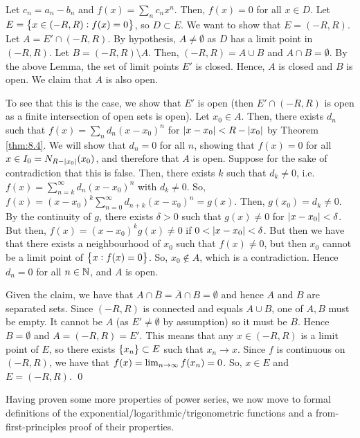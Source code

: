 \begin{nproof}
    Let $c_n = a_n - b_n$ and $f(x) = \sum_n c_nx^n$. Then, $f(x) = 0$ for all $x \in D$. Let $E = \set{x \in (-R, R): f(x) = 0}$, so $D \subset E$. We want to show that $E = (-R, R)$. Let $A = E' \cap (-R, R)$. By hypothesis, $A \neq \emptyset$ as $D$ has a limit point in $(-R, R)$. Let $B = (-R, R) \setminus A$. Then, $(-R, R) = A \cup B$ and $A \cap B = \emptyset$. By the above Lemma, the set of limit points $E'$ is closed. Hence, $A$ is closed and $B$ is open. We claim that $A$ is also open.

    To see that this is the case, we show that $E'$ is open (then $E' \cap (-R, R)$ is open as a finite intersection of open sets is open). Let $x_0 \in A$. Then, there exists $d_n$ such that $f(x) = \sum_n d_n(x - x_0)^n$ for $\abs{x - x_0} < R - \abs{x_0}$ by Theorem \ref{thm:8.4}. We will show that $d_n = 0$ for all $n$, showing that $f(x) = 0$ for all $x \in I_0 = N_{R - \abs{x_0}}(x_0)$, and therefore that $A$ is open. Suppose for the sake of contradiction that this is false. Then, there exists $k$ such that $d_k \neq 0$, i.e. $f(x) = \sum_{n=k}^\infty d_n(x - x_0)^n$ with $d_k \neq 0$. So, $f(x) = (x-x_0)^k\sum_{n=0}^\infty d_{n+k}(x - x_0)^n = g(x)$. Then, $g(x_0) = d_k \neq 0$. By the continuity of $g$, there exists $\delta > 0$ such that $g(x) \neq 0$ for $\abs{x - x_0} < \delta$. But then, $f(x) = (x - x_0)^kg(x) \neq 0$ if $0 < \abs{x - x_0} < \delta$. But then we have that there exists a neighbourhood of $x_0$ such that $f(x) \neq 0$, but then $x_0$ cannot be a limit point of $\set{x: f(x) = 0}$. So, $x_0 \notin A$, which is a contradiction. Hence $d_n = 0$ for all $n \in \mathbb{N}$, and $A$ is open. 
    
    Given the claim, we have that $A \cap \overline{B} = \overline{A} \cap B = \emptyset$ and hence $A$ and $B$ are separated sets. Since $(-R, R)$ is connected and equals $A \cup B$, one of $A, B$ must be empty. It cannot be $A$ (as $E' \neq \emptyset$ by assumption) so it must be $B$. Hence $B = \emptyset$ and $A = (-R, R) = E'$. This means that any $x \in (-R, R)$ is a limit point of $E$, so there exists $\set{x_n} \subset E$ such that $x_n \rightarrow x$. Since $f$ is continuous on $(-R, R)$, we have that $f(x) = \lim_{n \rightarrow \infty} f(x_n) = 0$. So, $x \in E$ and $E = (-R, R)$. \qed
\end{nproof}
\noindent Having proven some more properties of power series, we now move to formal definitions of the exponential/logarithmic/trigonometric functions and a from-first-principles proof of their properties. 


